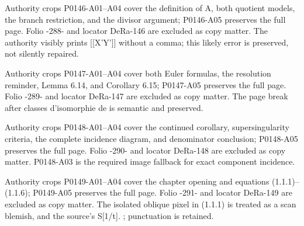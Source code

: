 \documentclass[11pt,a4paper]{article}
\begin{document}
\par\medskip
\hypertarget{D018-P0146}{}
\par\smallskip
Authority crops P0146-A01--A04 cover the definition of A, both quotient models, the branch restriction, and the divisor argument; P0146-A05 preserves the full page. Folio -288- and locator DeRa-146 are excluded as copy matter. The authority visibly prints [[X'Y']] without a comma; this likely error is preserved, not silently repaired.


\par\medskip
\hypertarget{D018-P0147}{}
\par\smallskip
Authority crops P0147-A01--A04 cover both Euler formulas, the resolution reminder, Lemma 6.14, and Corollary 6.15; P0147-A05 preserves the full page. Folio -289- and locator DeRa-147 are excluded as copy matter. The page break after classes d'isomorphie de is semantic and preserved.


\par\medskip
\hypertarget{D018-P0148}{}
\par\smallskip
Authority crops P0148-A01--A04 cover the continued corollary, supersingularity criteria, the complete incidence diagram, and denominator conclusion; P0148-A05 preserves the full page. Folio -290- and locator DeRa-148 are excluded as copy matter. P0148-A03 is the required image fallback for exact component incidence.


\par\medskip
\hypertarget{D018-P0149}{}
\par\smallskip
Authority crops P0149-A01--A04 cover the chapter opening and equations (1.1.1)--(1.1.6); P0149-A05 preserves the full page. Folio -291- and locator DeRa-149 are excluded as copy matter. The isolated oblique pixel in (1.1.1) is treated as a scan blemish, and the source's S[1/t]. ; punctuation is retained.
\end{document}
